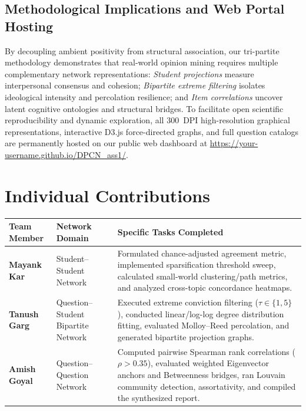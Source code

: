 \documentclass[10pt, a4paper]{article}
\begin{document}
\subsection{Methodological Implications and Web Portal Hosting}
By decoupling ambient positivity from structural association, our tri-partite methodology demonstrates that real-world opinion mining requires multiple complementary network representations: \textit{Student projections} measure interpersonal consensus and cohesion; \textit{Bipartite extreme filtering} isolates ideological intensity and percolation resilience; and \textit{Item correlations} uncover latent cognitive ontologies and structural bridges. To facilitate open scientific reproducibility and dynamic exploration, all 300~DPI high-resolution graphical representations, interactive D3.js force-directed graphs, and full question catalogs are permanently hosted on our public web dashboard at \url{https://your-username.github.io/DPCN_ass1/}.

\section{Individual Contributions}

\begin{table}[H]
\centering
\small
\begin{tabular}{p{2.6cm} p{4.6cm} p{8.8cm}}
\toprule
\textbf{Team Member} & \textbf{Network Domain} & \textbf{Specific Tasks Completed} \\
\midrule
\textbf{Mayank Kar} & Student--Student Network & Formulated chance-adjusted agreement metric, implemented sparsification threshold sweep, calculated small-world clustering/path metrics, and analyzed cross-topic concordance heatmaps. \\
\midrule
\textbf{Tanush Garg} & Question--Student Bipartite Network & Executed extreme conviction filtering ($\tau \in \{1, 5\}$), conducted linear/log-log degree distribution fitting, evaluated Molloy--Reed percolation, and generated bipartite projection graphs. \\
\midrule
\textbf{Amish Goyal} & Question--Question Network & Computed pairwise Spearman rank correlations ($\rho > 0.35$), evaluated weighted Eigenvector anchors and Betweenness bridges, ran Louvain community detection, assortativity, and compiled the synthesized report. \\
\bottomrule
\end{tabular}
\end{table}
\end{document}
